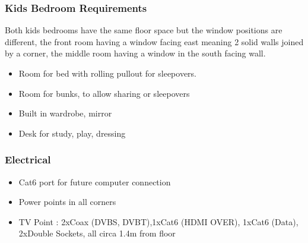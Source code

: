 \subsubsection{Kids Bedroom Requirements}
Both kids bedrooms have the same floor space but the window positions are different, the front room having a window facing east meaning 2 solid walls joined by a corner, the middle room having a window in the south facing wall.

\begin{itemize}
\item Room for bed with rolling pullout for sleepovers. 
\item Room for bunks, to allow sharing or sleepovers
\item Built in wardrobe, mirror
\item Desk for study, play, dressing
\end{itemize}

\subsubsection{Electrical}
\begin{itemize}
\item Cat6 port for future computer connection
\item Power points in all corners
\item TV Point : 2xCoax (DVBS, DVBT),1xCat6 (HDMI OVER), 1xCat6 (Data), 2xDouble Sockets, all circa 1.4m from floor

\end{itemize}

